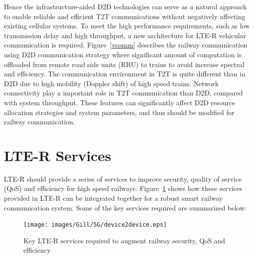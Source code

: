 Hence the infrastructure-aided D2D technologies can serve as a natural approach to enable reliable and efficient T2T communications without negatively affecting existing cellular systems. To meet the high performance requirements, such as low transmission delay and high throughput, a new architecture for LTE-R vehicular communication is required. Figure~\ref{vcomm} describes the railway communication  using D2D communication strategy where significant amount of computation is offloaded from remote road side units (RRU) to trains to avoid increase spectral and efficiency. The communication environment in T2T is quite different than in D2D due to high mobility (Doppler shift) of high speed trains. Network connectivity play a important role in T2T communication than D2D, compared with system throughput. These features can significantly affect D2D resource allocation strategies and system parameters, and thus should be modified for railway communication.

\section{LTE-R Services}
LTE-R should provide a series of services to improve security, quality of service (QoS) and efficiency for high speed railways. Figure~\ref{d2d} shows how these services provided in LTE-R can be integrated together for a robust smart railway communication system. Some of the key services required are summarized below:
\begin{figure}[!ht]
	\centering
\texttt{[image: images/Gill/5G/device2device.eps]}
	\caption{Key LTE-R services required to augment railway security, QoS and efficiency}
	\label{d2d}
\end{figure}

